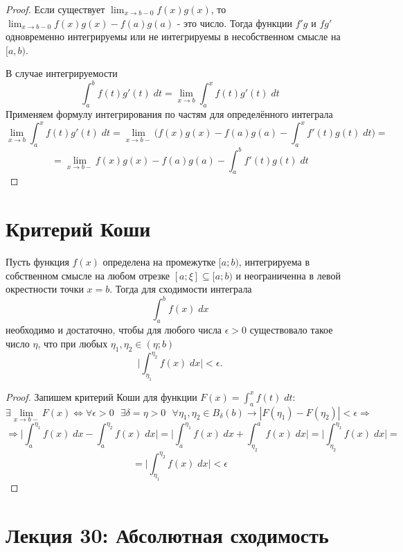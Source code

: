 	\begin{proof}
		Если существует $\displaystyle\lim_{x \to b - 0} f(x)g(x)$, то $\displaystyle\lim_{x \to b - 0} f(x)g(x) - f(a)g(a)$ - это число. Тогда функции $f'g$ и $fg'$ одновременно интегрируемы или не интегрируемы в несобственном смысле на $[a, b)$.
		
		В случае интегрируемости
		\[ \int_a^b f(t)g'(t) \; dt = \lim_{x \to b} \int_a^x f(t)g'(t) \; dt \]
		Применяем формулу интегрирования по частям для определённого интеграла
		\[ \lim_{x \to b} \int_a^x f(t)g'(t) \; dt = \lim_{x \to b-} \bigg(f(x)g(x) - f(a)g(a) - \int_a^x f'(t)g(t) \; dt \bigg) = \]
		\[ = \lim_{x \to b-} f(x)g(x) - f(a)g(a) - \int_a^b f'(t)g(t) \; dt \]
	\end{proof}
	
	\section{Критерий Коши}
	
	\begin{theorem}
		Пусть функция $f(x)$ определена на промежутке $[a; b)$,
		интегрируема в собственном смысле на любом отрезке
		$[a; \xi] \subseteq [a; b)$ и неограниченна в левой окрестности точки $x = b$. Тогда для сходимости интеграла
		\[ \int_a^b f(x) \; dx \]
		необходимо и достаточно, чтобы для любого числа $\epsilon > 0$
		существовало такое число $\eta$, что при любых $\eta_1, \eta_2 \in (\eta; b)$
		\[ \bigg| \int_{\eta_1}^{\eta_2} f(x) \; dx \bigg| < \epsilon. \]
	\end{theorem}
	
	\begin{proof}
		Запишем критерий Коши для функции $F(x) = \int_a^x f(t) \; dt$:
		\[ \exists \lim_{x \to b-} F(x) \Leftrightarrow \forall \epsilon > 0 \text{ } \exists \delta = \eta > 0 \text{ } \forall \eta_1, \eta_2 \in B_{\delta}(b) \rightarrow |F(\eta_1) - F(\eta_2)| < \epsilon \Rightarrow \]
		\[ \Rightarrow \bigg| \int_{a}^{\eta_1} f(x) \; dx - \int_{a}^{\eta_2} f(x) \; dx \bigg| = \bigg| \int_{a}^{\eta_1} f(x) \; dx + \int_{\eta_2}^{a} f(x) \; dx \bigg| = \bigg| \int_{\eta_2}^{\eta_1} f(x) \; dx \bigg| = \]
		\[ = \bigg| \int_{\eta_1}^{\eta_2} f(x) \; dx \bigg| < \epsilon \]
	\end{proof}
	
	\section*{Лекция 30: Абсолютная сходимость}
	
